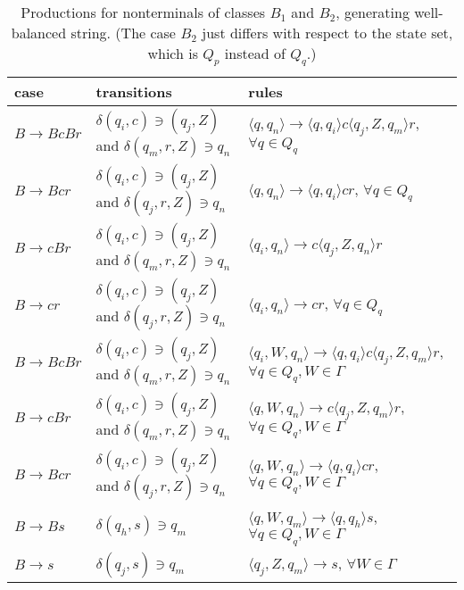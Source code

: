 \documentclass[3p,11pt]{elsarticle}
\begin{document}
\begin{table}[h!]
\caption{\label{productionsB}Productions for  nonterminals of classes $B_1$ and $B_2$, generating well-balanced string. (The case $B_2$ just differs with respect to the state set, which is $Q_p$ instead of $Q_q$.) }
\renewcommand{\arraystretch}{1.3}
\begin{tabular}{l|p{}|p{}}
  case & transitions  & rules \\
  \hline
 $ B\to BcBr$ & $\delta(q_i, c)\ni (q_j, Z)$ and $\delta(q_m, r, Z)\ni q_n$
                   & $\langle q,q_n \rangle  \to \langle q,q_i \rangle c \langle q_j, Z, q_m\rangle r$, ${\forall q \in Q_q}$\\


 $B\to Bcr$   &   $\delta(q_i, c)\ni (q_j, Z)$ and $\delta(q_j, r, Z)\ni q_n$
                        & $\langle q,q_n \rangle  \to \langle q,q_i \rangle c  r $, ${\forall q \in Q_q}$ \\

$B\to cBr$   &   $\delta(q_i, c)\ni (q_j, Z)$ and $\delta(q_m, r, Z)\ni q_n$
                        & $\langle q_i,q_n \rangle  \to c \langle q_j, Z,q_n \rangle r $ \\


 $B\to cr$   & $\delta(q_i, c)\ni (q_j, Z)$ and $\delta(q_j, r, Z)\ni q_n$
                      & $\langle q_i,q_n \rangle  \to  c  r $, ${\forall q \in Q_q}$ \\

$B\to BcBr$ & $\delta(q_i, c)\ni (q_j, Z)$ and $\delta(q_m, r, Z)\ni q_n$
                   & ${\langle q_i,W,q_n \rangle  \to \langle q,q_i \rangle c \langle q_j, Z, q_m\rangle r}$, ${\forall q \in Q_q, W\in\Gamma}$ \\

$B\to cBr$   &   $\delta(q_i, c)\ni (q_j, Z)$ and $\delta(q_m, r, Z)\ni q_n$ & $\langle q,W,q_n \rangle \to c \langle q_j,Z,q_m \rangle r$, ${\forall q \in Q_q,W\in\Gamma}$  \\


 $B\to Bcr$ & $\delta(q_i, c)\ni (q_j, Z)$ and $\delta(q_j, r, Z)\ni q_n$  & $\langle q,W,q_n \rangle \to \langle q,q_i \rangle c r$, ${\forall q \in Q_q,W\in\Gamma}$  \\

 $B\to Bs$   & $\delta(q_h, s)\ni q_m$ & $\langle q, W, q_m \rangle \to  \langle q, q_h \rangle s$, ${\forall q \in Q_q, W\in\Gamma}$ \\

  $B\to s$    & $\delta(q_j, s)\ni q_m$ & $\langle q_j, Z, q_m \rangle \to s$, ${\forall W\in\Gamma}$ \\\hline
\end{tabular}
\end{table}
\end{document}
